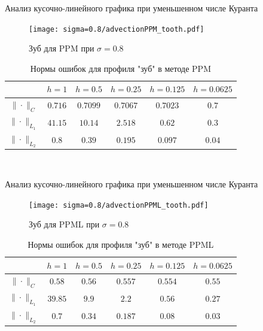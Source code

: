 \documentclass[unicode, 8pt]{beamer}
\begin{document}
    \begin{frame}{Анализ кусочно-линейного графика при уменьшенном числе Куранта}
        \begin{figure}[h]
            \centering
            \texttt{[image: sigma=0.8/advectionPPM\_tooth.pdf]}
            \caption{Зуб для PPM при $ \sigma = 0.8 $}
            \label{fig:ppm_tooth_08}
        \end{figure}
        \begin{table}[h]
            \centering
            \begin{tabular}{ |c|c|c|c|c|c| } 
             \hline
             & $ h=1 $ &  $ h=0.5$ &  $ h=0.25 $ &  $ h=0.125 $ &  $ h=0.0625 $ \\ 
             \hline 
             $\| \cdot \|_{C}$ & $0.716$ & $0.7099$ & $0.7067$ & $0.7023$ & $0.7$
             \\
             \hline
             $\| \cdot \|_{L_1}$ & $41.15$ & $10.14$ & $2.518$ & $0.62$ & $0.3$
             \\
             \hline
             $\| \cdot \|_{L_2}$ & $0.8$ & $0.39$ & $0.195$ & $0.097$ & $0.04$
             \\
             \hline
            \end{tabular}
            \\[0.1em]
            \caption{Нормы ошибок для профиля "зуб" в методе PPM}
            \label{table:toothPPM}
        \end{table}
    \end{frame}

    \begin{frame}{Анализ кусочно-линейного графика при уменьшенном числе Куранта}
        \begin{figure}[h]
            \centering
            \texttt{[image: sigma=0.8/advectionPPML\_tooth.pdf]}
            \caption{Зуб для PPML при $ \sigma = 0.8 $}
            \label{fig:ppml_tooth_08}
        \end{figure}
        \begin{table}[h]
            \centering
            \begin{tabular}{ |c|c|c|c|c|c| } 
             \hline
             & $ h=1 $ &  $ h=0.5$ &  $ h=0.25 $ &  $ h=0.125 $ &  $ h=0.0625 $ 
             \\ 
             \hline
             $\| \cdot \|_{C}$ & $0.58$ & $0.56$ & $0.557$ & $0.554$ & $0.55$ 
             \\
             \hline
             $\| \cdot \|_{L_1}$ & $39.85$ & $9.9$ & $2.2$ & $0.56$ & $0.27$
             \\
             \hline
             $\| \cdot \|_{L_2}$ & $0.7$ & $0.34$ & $0.187$ & $0.08$ & $0.03$ 
             \\
             \hline
            \end{tabular}
            \\[0.1em]
            \caption{Нормы ошибок для профиля "зуб" в методе PPML}
            \label{table:toothPPML}
        \end{table}
    \end{frame}
\end{document}
